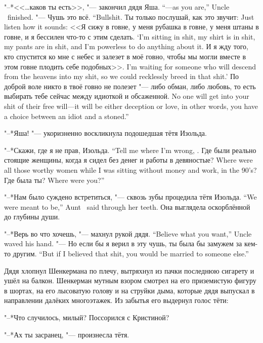 {"--*<<\ldots{}каков ты есть>>, "--- закончил дядя Яша.}
{``---as you are,'' Uncle \Yasha\ finished.}
{"--- Чушь это всё.}
{``Bullshit.}
{Ты только послушай, как это звучит:}
{Just listen how it sounds:}
{<<Я сижу в говне, у меня рубашка в говне, у меня штаны в говне, и я бессилен что-то с этим сделать.}
{`I'm sitting in shit, my shirt is in shit, my pants are in shit, and I'm powerless to do anything about it.}
{И я жду того, кто спустится ко мне с небес и залезет в моё говно, чтобы мы могли вместе в этом говне плодить себе подобных>>.}
{I'm waiting for someone who will descend from the heavens into my shit, so we could recklessly breed in that shit.'}
{По доброй воле никто в твоё говно не полезет "--- либо обман, либо любовь, то есть выбирать тебе сейчас между идиоткой и обсаженной.}
{No one will get into your shit of their free will---it will be either deception or love, in other words, you have a choice between an idiot and a stoned.''}

"--*Яша! "--- укоризненно воскликнула подошедшая тётя Изольда.

{"--*Скажи, где я не прав, Изольда.}
{``Tell me where I'm wrong, \Izolda.}
{Где были реально стоящие женщины, когда я сидел без денег и работы в девяностые?}
{Where were all those worthy women while I was sitting without money and work, in the 90's?}
{Где была ты?}
{Where were you?''}

{"--*Нам было суждено встретиться, "--- сквозь зубы процедила тётя Изольда.}
{``We were meant to be,'' Aunt \Izolda\ said through her teeth.}
Она выглядела оскорблённой до глубины души.

{"--*Верь во что хочешь, "--- махнул рукой дядя.}
{``Believe what you want,'' Uncle waved his hand.}
{"--- Но если бы я верил в эту чушь, ты была бы замужем за кем-то другим.}
{``But if I believed that shit, you would be married to someone else.''}

Дядя хлопнул Шенкермана по плечу, вытряхнул из пачки последнюю сигарету и ушёл на балкон.
Шенкерман мутным взором смотрел на его приземистую фигуру в шортах, на его лысоватую голову и на струйки дыма, которые дядя выпускал в направлении далёких многоэтажек.
Из забытья его выдернул голос тёти:

"--*Что случилось, милый?
Поссорился с Кристиной?

\asterism

"--*Ах ты засранец, "--- произнесла тётя.

